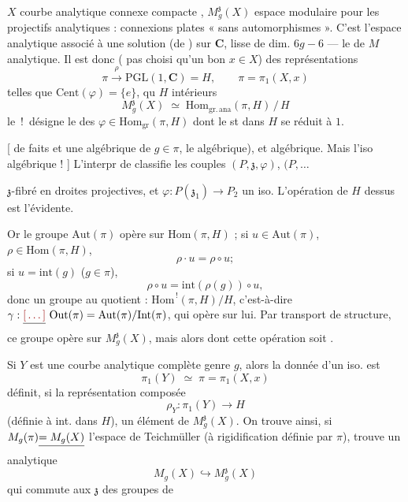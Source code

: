 \documentclass[11pt,a4paper]{article}
\begin{document}
$X$ courbe analytique connexe compacte \ill{},
$M_g^{\mathfrak{z}}(X)$ espace modulaire pour les \ill{} projectifs
analytiques : connexions plates « sans automorphismes ». C'est l'espace
analytique associé à une solution (de \ill{}) sur $\mathbf{C}$,
 lisse de dim. $6g-6$ \ill{} --- le  \ill{}
de $M$ \ill{} analytique. Il est donc \ill{} (\ill{} pas choisi qu'un bon
$x \in X$) \ill{} des représentations
\[
  \pi \xrightarrow{\;\rho\;} \mathrm{PGL}(1, \mathbf{C}) = H,
  \qquad \pi = \pi_1(X, x)
\]
 \ill{} telles que $\mathrm{Cent}(\varphi) = \{e\}$,
 qu\ill{} $H$ \ill{} intérieurs
\[
  M_g^{\mathfrak{z}}(X) \;\simeq\;
  \mathrm{Hom}_{\mathrm{gr.\,ana}}(\pi, H) \,\big/\, H
\]
\ill{} le \,!\, désigne le \ill{} des
$\varphi \in \mathrm{Hom}_{\mathrm{gr}}(\pi, H)$ dont le st\ill{} dans $H$ se
réduit à $1$.

[ \ill{} de faits et \ill{} une \ill{} algébrique de \ill{} $g \in \pi$, le
\ill{} \ill{} algébrique), et \ill{} algébrique. Mais l'iso \ill{}
 \ill{} algébrique ! ] L'interpr\ill{} \ill{} de \ill{}
classifie les couples $(P, \mathfrak{z}, \varphi)$, $(P, \ldots$


$\mathfrak{z}$-fibré en droites projectives, et
$\varphi : P(\mathfrak{z}_1) \to P_2$ un iso. L'opération de $H$ dessus est
l'évidente.

Or le groupe $\mathrm{Aut}(\pi)$ opère  sur
$\mathrm{Hom}(\pi, H)$ ; si $u \in \mathrm{Aut}(\pi)$,
$\rho \in \mathrm{Hom}(\pi, H)$, \ill{}
\[
  \rho \cdot u = \rho \circ u ;
\]
si $u = \mathrm{int}(g)$ ($g \in \pi$), \ill{}
\[
  \rho \circ u = \mathrm{int}(\rho(g)) \circ u,
\]
donc \ill{} un groupe au quotient : $\mathrm{Hom}^{\,!}(\pi, H)/H$,
c'est-à-dire $\gamma : \struck{\ill{}}\ \mathrm{Out}(\pi)
= \mathrm{Aut}(\pi)/\mathrm{Int}(\pi)$, qui opère sur lui. Par transport de
structure, ce groupe opère sur $M_g^{\mathfrak{z}}(X)$, mais alors dont cette
opération soit .

Si $Y$ est une courbe analytique complète  genre $g$, alors la
donnée d'un iso. est
\[
  \pi_1(Y) \;\simeq\; \pi = \pi_1(X, x)
\]
définit, si la représentation composée
\[
  \rho_Y : \pi_1(Y) \longrightarrow H
\]
(définie \ill{} à \ill{} int. dans $H$), un élément de
$M_g^{\mathfrak{z}}(X)$. On trouve ainsi, si $M_g(\pi) \struck{= M_g(X)}$
\ill{} l'espace de Teichmüller (à rigidification définie par $\pi$), \ill{}
trouve un  analytique 
\[
  M_g(X) \hookrightarrow M_g^{\mathfrak{z}}(X)
\]
qui commute aux \ill{} $\mathfrak{z}$ \ill{} des groupes de
\end{document}
